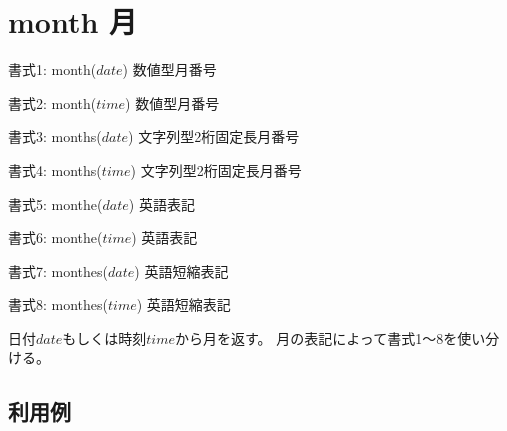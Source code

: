 
%

\section{month 月\label{sect:month}}

書式1: month($date$) 数値型月番号

書式2: month($time$) 数値型月番号

書式3: months($date$) 文字列型2桁固定長月番号

書式4: months($time$) 文字列型2桁固定長月番号

書式5: monthe($date$) 英語表記

書式6: monthe($time$) 英語表記

書式7: monthes($date$) 英語短縮表記

書式8: monthes($time$) 英語短縮表記

日付$date$もしくは時刻$time$から月を返す。
月の表記によって書式1〜8を使い分ける。

\subsection*{利用例}


%

